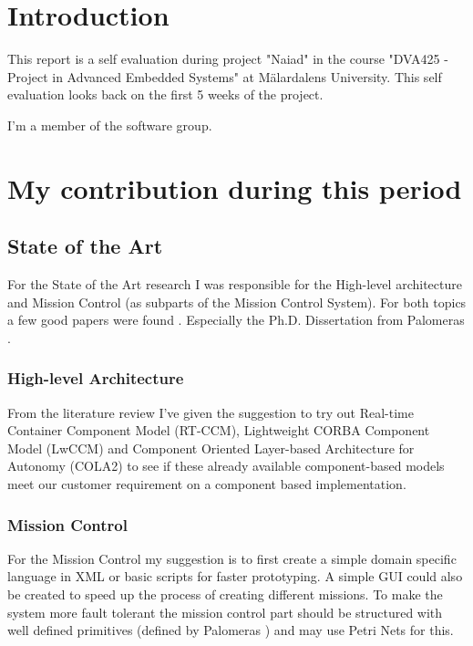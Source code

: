 \section{Introduction}
This report is a self evaluation during project "Naiad" in the course
"DVA425 - Project in Advanced Embedded Systems" at M\"{a}lardalens University.
This self evaluation looks back on the first 5 weeks of the project.

I'm a member of the software group.

\section{My contribution during this period}
\subsection{State of the Art}
For the State of the Art research I was responsible for the High-level
architecture and Mission Control (as subparts of the Mission Control System).
For both topics a few good papers were found
\cite{palomeras2012,palomeras2011,martinez2008,martinez2013}.
Especially the Ph.D. Dissertation from Palomeras \cite{palomeras2011}.

\subsubsection{High-level Architecture}
From the literature review I've given the suggestion to try out
Real-time Container Component Model (RT-CCM),
Lightweight CORBA Component Model (LwCCM) and
Component Oriented Layer-based Architecture for Autonomy (COLA2) to see if
these already available component-based models meet our
customer requirement on a component based implementation.

\subsubsection{Mission Control}
For the Mission Control my suggestion is to first create a simple domain
specific language in XML or basic scripts for faster prototyping. A simple
GUI could also be created to speed up the process of creating different missions.
To make the system more fault tolerant the mission control part
should be structured with well defined primitives (defined by Palomeras
\cite{palomeras2011}) and may use Petri Nets for this.

